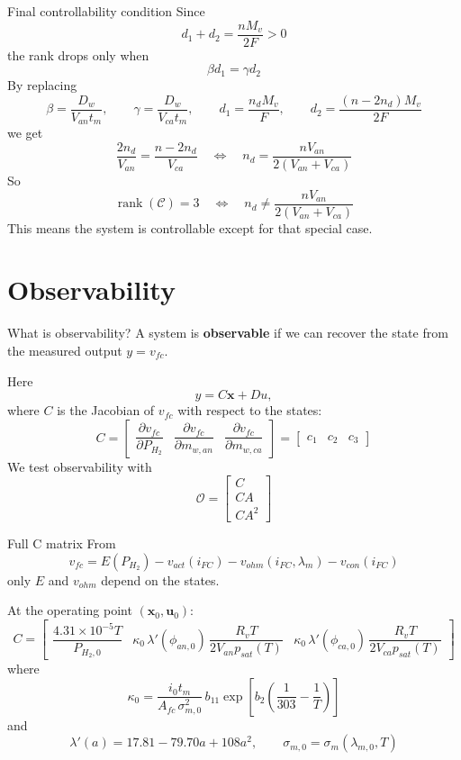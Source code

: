 \documentclass[aspectratio=169]{beamer}
\begin{document}
\begin{frame}{Final controllability condition}
    Since
    \[
        d_1 + d_2 = \frac{nM_v}{2F} > 0
    \]
    the rank drops only when
    \[
        \beta d_1 = \gamma d_2
    \]
    By replacing
    \[
        \beta = \frac{D_w}{V_{an}t_m}, \qquad \gamma = \frac{D_w}{V_{ca}t_m}, \qquad
        d_1 = \frac{n_d M_v}{F}, \qquad d_2 = \frac{(n-2n_d)M_v}{2F}
    \]
    we get
    \[
        \frac{2n_d}{V_{an}} = \frac{n-2n_d}{V_{ca}}
        \quad \Longleftrightarrow \quad
        n_d = \frac{nV_{an}}{2(V_{an}+V_{ca})}
    \]
    So
    \[
        \operatorname{rank}(\mathcal{C}) = 3
        \quad \Longleftrightarrow \quad
        n_d \neq \frac{nV_{an}}{2(V_{an}+V_{ca})}
    \]
    This means the system is controllable except for that special case.
\end{frame}

\section{Observability}

\begin{frame}{What is observability?}
    A system is \textbf{observable} if we can recover the state
    from the measured output $y = v_{fc}$.

    \medskip
    Here
    \[
        y = C\mathbf{x} + Du,
    \]
    where $C$ is the Jacobian of $v_{fc}$ with respect to the states:
    \[
        C = \begin{bmatrix}
            \dfrac{\partial v_{fc}}{\partial P_{H_2}} &
            \dfrac{\partial v_{fc}}{\partial m_{w,an}} &
            \dfrac{\partial v_{fc}}{\partial m_{w,ca}}
        \end{bmatrix}
        = \begin{bmatrix} c_1 & c_2 & c_3 \end{bmatrix}
    \]
    We test observability with
    \[
        \mathcal{O} = \begin{bmatrix} C \\ CA \\ CA^2 \end{bmatrix}
    \]
\end{frame}

\begin{frame}{Full C matrix}
    From
    \[
        v_{fc} = E(P_{H_2}) - v_{act}(i_{FC}) - v_{ohm}(i_{FC},\lambda_m) - v_{con}(i_{FC})
    \]
    only $E$ and $v_{ohm}$ depend on the states.

    \medskip
    At the operating point $(\mathbf{x}_0,\mathbf{u}_0)$:
    \[
        C = \begin{bmatrix}
            \dfrac{4.31\times 10^{-5}T}{P_{H_2,0}} &
            \kappa_0\,\lambda'(\phi_{an,0})\,\dfrac{R_v T}{2V_{an}p_{sat}(T)} &
            \kappa_0\,\lambda'(\phi_{ca,0})\,\dfrac{R_v T}{2V_{ca}p_{sat}(T)}
        \end{bmatrix}
    \]
    where
    \[
        \kappa_0 = \frac{i_0 t_m}{A_{fc}\,\sigma_{m,0}^{2}}\,b_{11}
        \exp\!\left[b_2\!\left(\frac{1}{303}-\frac{1}{T}\right)\right]
    \]
    and
    \[
        \lambda'(a) = 17.81 - 79.70a + 108a^2, \qquad
        \sigma_{m,0} = \sigma_m(\lambda_{m,0},T)
    \]
\end{frame}
\end{document}
